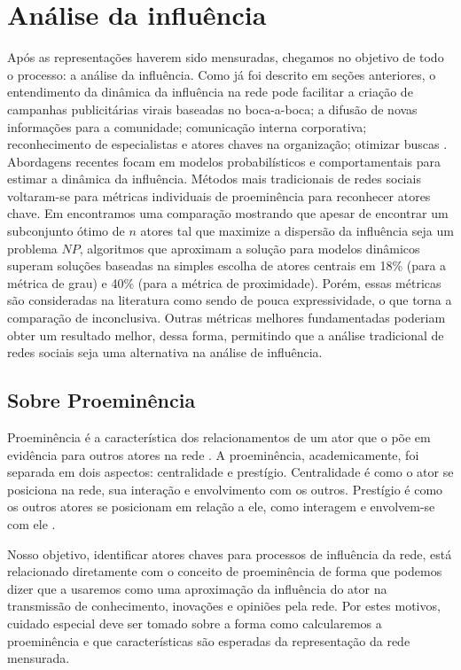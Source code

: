 \chapter{Análise da influência}
\label{ch:mineracao}

Após as representações haverem sido mensuradas, chegamos no objetivo de todo o
processo: a análise da influência. Como já foi descrito em seções anteriores, o
entendimento da dinâmica da influência na rede pode facilitar a criação de
campanhas publicitárias virais baseadas no boca-a-boca; a difusão de novas
informações para a comunidade; comunicação interna corporativa; reconhecimento de
especialistas e atores chaves na organização; otimizar buscas
\citep{Kirchhoff2009}. Abordagens recentes focam em modelos probabilísticos e
comportamentais para estimar a dinâmica da influência. Métodos mais tradicionais
de redes sociais voltaram-se para métricas individuais de proeminência para
reconhecer atores chave. Em \citet{Kempe2003} encontramos uma comparação
mostrando que apesar de encontrar um subconjunto ótimo de $n$ atores tal que
maximize a dispersão da influência seja um problema $NP$, algoritmos que
aproximam a solução para modelos dinâmicos superam soluções baseadas na simples
escolha de atores centrais em 18\% (para a métrica de grau) e 40\% (para a
métrica de proximidade). Porém, essas métricas são consideradas na literatura
como sendo de pouca expressividade, o que torna a comparação de
\citeauthor{Kempe2003} inconclusiva. Outras métricas melhores fundamentadas
poderiam obter um resultado melhor, dessa forma, permitindo que a análise
tradicional de redes sociais seja uma alternativa na análise de influência.

\section{Sobre Proeminência}
\label{sec:sobre-proem}
Proeminência é a característica dos relacionamentos de um ator que o põe em
evidência para outros atores na rede \citep{Wasserman}. A proeminência,
academicamente, foi separada em dois aspectos: centralidade e prestígio.
Centralidade é como o ator se posiciona na rede, sua interação e envolvimento com
os outros. Prestígio é como os outros atores se posicionam em relação a ele, como
interagem e envolvem-se com ele \citep{Knoke1983}.

Nosso objetivo, identificar atores chaves para processos de influência da rede,
está relacionado diretamente com o conceito de proeminência de forma que podemos
dizer que a usaremos como uma aproximação da influência do ator na transmissão de
conhecimento, inovações e opiniões pela rede. Por estes motivos, cuidado especial
deve ser tomado sobre a forma como calcularemos a proeminência e que
características são esperadas da representação da rede mensurada.

